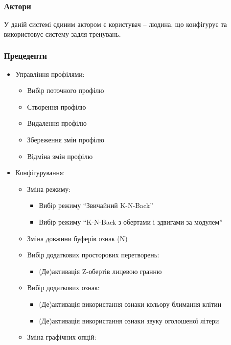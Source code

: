 \subsubsection{Актори}
У даній системі єдиним актором є користувач -- людина, що конфігурує та використовує систему задля тренувань.

\subsubsection{Прецеденти}

\begin{itemize}
  \item Управління профілями:
    \begin{itemize}
      \item Вибір поточного профілю
      \item Створення профілю
      \item Видалення профілю
      \item Збереження змін профілю
      \item Відміна змін профілю
    \end{itemize}
  \item Конфігурування:
    \begin{itemize}
      \item Зміна режиму:
        \begin{itemize}
          \item Вибір режиму ``Звичайний K-N-Back''
          \item Вибір режиму ``K-N-Back з обертами і здвигами за модулем''
        \end{itemize}
      \item Зміна довжини буферів ознак (N)
      \item Вибір додаткових просторових перетворень:
        \begin{itemize}
          \item (Де)активація Z-обертів лицевою гранню
        \end{itemize}
      \item Вибір додаткових ознак:
        \begin{itemize}
          \item (Де)активація використання ознаки кольору блимання клітин
          \item (Де)активація використання ознаки звуку оголошеної літери
        \end{itemize}
      \item Зміна графічних опцій:
        \begin{itemize}

\end{itemize}
\end{itemize}
\end{itemize}
